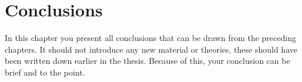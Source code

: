 \chapter{Conclusions}\label{conclusions}
In this chapter you present all conclusions that can be drawn from the preceding chapters.
It should not introduce any new material or theories, these should have been written down earlier in the thesis. Because of this, your conclusion can be brief and to the point.



